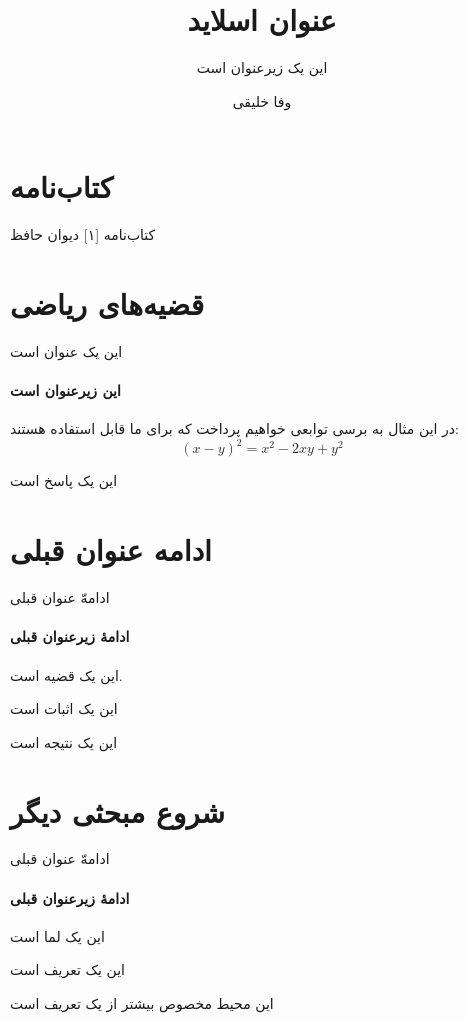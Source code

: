 \documentclass{beamer}
\title{عنوان اسلاید}
\subtitle{این یک زیرعنوان است}
\author{وفا خلیقی}
\institute{دانشگاه تهران}
\begin{document}
\begin{frame}
\titlepage
\end{frame}
\section{کتاب‌نامه}
\begin{frame}{کتاب‌نامه}
[۱] دیوان حافظ
\end{frame}
\section{قضیه‌های ریاضی}
\begin{frame}{این یک عنوان است}
\framesubtitle{این زیرعنوان است}
\begin{مثال}
در این مثال به برسی توابعی خواهیم پرداخت که برای ما قابل استفاده هستند:
\begin{equation}
(x-y)^2=x^2-2xy+y^2
\end{equation}
\end{مثال}
\begin{پاسخ}
این یک پاسخ است
\end{پاسخ}

\end{frame}
\section{ادامه عنوان قبلی}
\begin{frame}{ادامهّ عنوان قبلی}
\framesubtitle{ادامهٔ زیرعنوان قبلی}
\begin{قضیه}
این یک قضیه است.
\end{قضیه}
\begin{اثبات}
این یک اثبات است
\end{اثبات}
\begin{نتیجه}
این یک نتیجه است
\end{نتیجه}
\end{frame}
\section{شروع مبحثی دیگر}
\begin{frame}{ادامهّ عنوان قبلی}
\framesubtitle{ادامهٔ زیرعنوان قبلی}
\begin{لما}
این یک لما است
\end{لما}
\begin{تعریف}
این یک تعریف است
\end{تعریف}
\begin{تعریفها}
این محیط مخصوص بیشتر از یک تعریف است
\end{تعریفها}
\end{frame}
\end{document}

